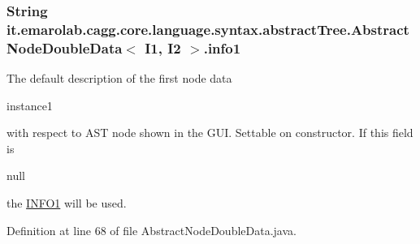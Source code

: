 \hypertarget{classit_1_1emarolab_1_1cagg_1_1core_1_1language_1_1syntax_1_1abstractTree_1_1AbstractNodeDoubleData_3_01I1_00_01I2_01_4_a9cb0eda61491d6c704ee75948a93621a}{
\subsubsection[{info1}]{\setlength{\rightskip}{0pt plus 5cm}String it.\-emarolab.\-cagg.\-core.\-language.\-syntax.\-abstract\-Tree.\-Abstract\-Node\-Double\-Data$<$ I1, I2 $>$.info1\hspace{0.3cm}{\ttfamily [protected]}}}\label{classit_1_1emarolab_1_1cagg_1_1core_1_1language_1_1syntax_1_1abstractTree_1_1AbstractNodeDoubleData_3_01I1_00_01I2_01_4_a9cb0eda61491d6c704ee75948a93621a}
The default description of the first node data
\begin{DoxyCode}
instance1 
\end{DoxyCode}
 with respect to A\-S\-T node shown in the G\-U\-I. Settable on constructor. If this field is
\begin{DoxyCode}
null 
\end{DoxyCode}
 the \hyperlink{classit_1_1emarolab_1_1cagg_1_1core_1_1language_1_1syntax_1_1abstractTree_1_1AbstractNodeDoubleData_3_01I1_00_01I2_01_4_a0fc31565ff89bbacb069154c7d67e2a0}{I\-N\-F\-O1} will be used. 

Definition at line 68 of file Abstract\-Node\-Double\-Data.\-java.

